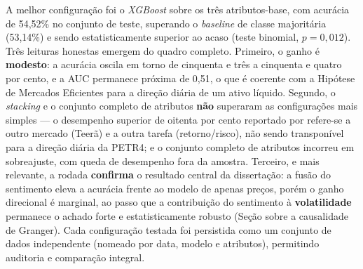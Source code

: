 A melhor configuração foi o \textit{XGBoost} sobre os três atributos-base, com acurácia de
54,52\% no conjunto de teste, superando o
\textit{baseline} de classe majoritária (53,14\%) e sendo
estatisticamente superior ao acaso (teste binomial, $p = 0,012$).
Três leituras honestas emergem do quadro completo. Primeiro, o ganho é \textbf{modesto}: a acurácia
oscila em torno de cinquenta e três a cinquenta e quatro por cento, e a AUC permanece próxima de
0,51, o que é coerente com a Hipótese de Mercados Eficientes para a direção diária de um ativo
líquido. Segundo, o \textit{stacking} e o conjunto completo de atributos \textbf{não} superaram as
configurações mais simples --- o desempenho superior de oitenta por cento reportado por
 refere-se a outro mercado (Teerã) e a outra tarefa (retorno/risco),
não sendo transponível para a direção diária da PETR4; e o conjunto completo de atributos incorreu
em sobreajuste, com queda de desempenho fora da amostra. Terceiro, e mais relevante, a rodada
\textbf{confirma} o resultado central da dissertação: a fusão do sentimento eleva a acurácia frente
ao modelo de apenas preços, porém o ganho direcional é marginal, ao passo que a contribuição do
sentimento à \textbf{volatilidade} permanece o achado forte e estatisticamente robusto (Seção
sobre a causalidade de Granger). Cada configuração testada foi persistida como um conjunto de dados
independente (nomeado por data, modelo e atributos), permitindo auditoria e comparação integral.
